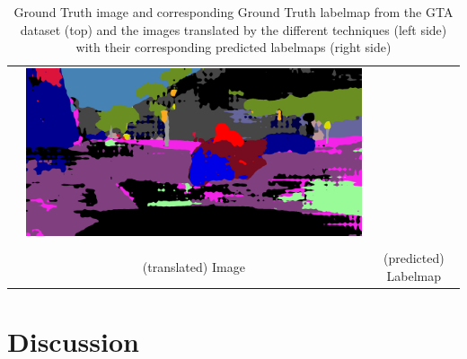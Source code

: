 \begin{table}
\begin{tabular}{ccc}
\begin{minipage}[c]{0.5\textwidth}
		\end{minipage} & 
		\begin{minipage}[c]{0.5\textwidth}
			\includegraphics[width=\textwidth]{images/evaluation/SG-GAN_00991_pred_label_img.png}
		\end{minipage} \\
		\multicolumn{2}{c}{} \\
		\multicolumn{1}{c}{} & (translated) Image & (predicted) Labelmap
	\end{tabular} 
	\caption{Ground Truth image and corresponding Ground Truth labelmap from the GTA dataset (top) and the images translated by the different techniques (left side) with their corresponding predicted labelmaps (right side)}
	\label{table:results_qual}
\end{table}
\section{Discussion}

